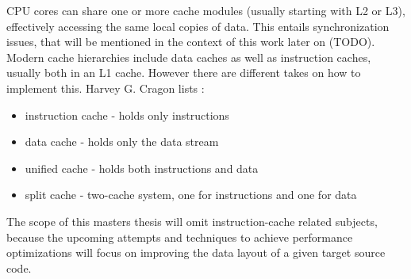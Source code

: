 CPU cores can share one or more cache modules (usually starting with L2 or L3), effectively accessing the same local copies of data. This entails synchronization issues, that will be mentioned in the context of this work later on (TODO).\\
Modern cache hierarchies include data caches as well as instruction caches, usually both in an L1 cache. However there are different takes on how to implement this. Harvey G. Cragon lists :
\begin{itemize}
	\item instruction cache - holds only instructions
	\item data cache - holds only the data stream
	\item unified cache - holds both instructions and data
	\item split cache - two-cache system, one for instructions and one for data
\end{itemize}
The scope of this masters thesis will omit instruction-cache related subjects, because the upcoming attempts and techniques to achieve performance optimizations will focus on improving the data layout of a given target source code.

